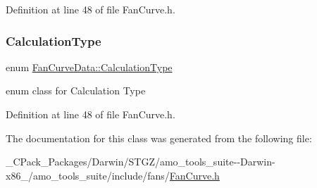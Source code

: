 Definition at line 48 of file Fan\+Curve.\+h.

\mbox{\label{class_fan_curve_data_af87fafad0a2a00e26ba82fb33b1a7282}} 
\subsubsection{\texorpdfstring{Calculation\+Type}{CalculationType}\hspace{0.1cm}{\footnotesize\ttfamily [3/3]}}
{\footnotesize\ttfamily enum \hyperlink{class_fan_curve_data_af87fafad0a2a00e26ba82fb33b1a7282}{Fan\+Curve\+Data\+::\+Calculation\+Type}\hspace{0.3cm}{\ttfamily [strong]}}

enum class for Calculation Type 

Definition at line 48 of file Fan\+Curve.\+h.



The documentation for this class was generated from the following file\+:\begin{DoxyCompactItemize}
\item 
\+\_\+\+C\+Pack\+\_\+\+Packages/\+Darwin/\+S\+T\+G\+Z/amo\+\_\+tools\+\_\+suite-\/-\/\+Darwin-\/x86\+\_/amo\+\_\+tools\+\_\+suite/include/fans/\hyperlink{___c_pack___packages_2_darwin_2_s_t_g_z_2amo__tools__suite--_darwin-x86__64_2amo__tools__suite_2include_2fans_2_fan_curve_8h}{Fan\+Curve.\+h}\end{DoxyCompactItemize}
